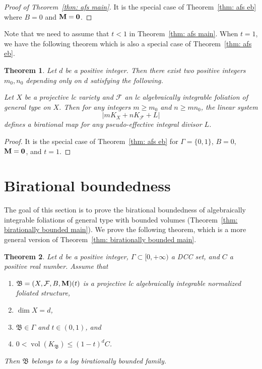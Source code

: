 \documentclass[11pt,reqno]{amsart}
\numberwithin{equation}{section}
\newcommand{\Mm}{{\bf{M}}}
\newcommand{\vol}{\operatorname{vol}}
\newcommand{\Bb}{{\mathfrak{B}}}
\newcommand{\Ff}{\mathcal{F}}
\newcommand{\Ii}{\Gamma}
\newtheorem{thm}{Theorem}[section]
\theoremstyle{definition}
\begin{document}
\begin{proof}[Proof of Theorem~\ref{thm: afs main}]
    It is the special case of Theorem~\ref{thm: afs eb} where $B=0$ and $\Mm=\bm{0}$.
\end{proof}

Note that we need to assume that $t<1$ in Theorem~\ref{thm: afs main}. When $t=1$, we have the following theorem which is also a special case of Theorem~\ref{thm: afs eb}.

\begin{thm}\label{thm: eb when t=1}
Let $d$ be a positive integer. Then there exist two positive integers $m_0,n_0$ depending only on $d$ satisfying the following.

Let $X$ be a projective lc variety and $\Ff$ an lc algebraically integrable foliation of general type on $X$. Then for any integers $m\geq m_0$ and $n\geq mn_0$, the linear system
$$|mK_X+nK_{\Ff}+L|$$
defines a birational map for any pseudo-effective integral divisor $L$.
\end{thm}
\begin{proof}
It is the special case of Theorem~\ref{thm: afs eb} for $\Ii=\{0,1\}$, $B=0$, $\Mm=\bm{0}$, and $t=1$.
\end{proof}

\section{Birational boundedness}\label{sec: birational boundedness}

The goal of this section is to prove the birational boundedness of algebraically integrable foliations of general type with bounded volumes (Theorem~\ref{thm: birationally bounded main}). We prove the following theorem, which is a more general version of Theorem~\ref{thm: birationally bounded main}.

\begin{thm}\label{thm: birational boundedness}
    Let $d$ be a positive integer, $\Ii\subset [0,+\infty)$ a DCC set, and $C$ a positive real number. Assume that
    \begin{enumerate}
        \item $\Bb=(X,\Ff,B,\Mm)(t)$ is a projective lc algebraically integrable normalized foliated structure,
        \item $\dim X=d$,
        \item $\Bb\in\Ii$ and $t\in (0,1)$, and
        \item $0<\vol(K_{\Bb})\leq (1-t)^dC$.
    \end{enumerate}
   Then $\Bb$ belongs to a log birationally bounded family.
\end{thm}
\end{document}
